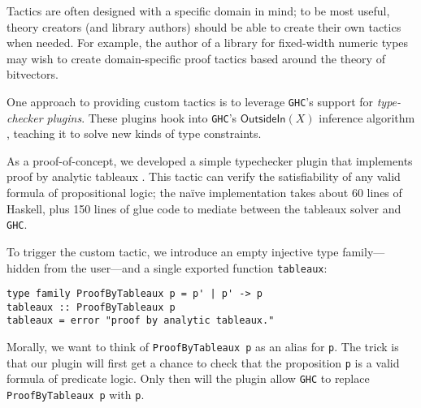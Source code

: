 \documentclass[format=sigplan, review=false, screen=true]{acmart}
\begin{document}
Tactics are often designed with a specific domain in mind; to be most useful,
theory creators (and library authors) should be able to create their own tactics
when needed. For example, the author of  a library for  fixed-width numeric types
may wish to create domain-specific proof tactics based around the theory of bitvectors.

One approach to providing custom tactics is to leverage \texttt{GHC}'s support for
\emph{type-checker plugins}. These plugins hook into \texttt{GHC}'s $\textsf{OutsideIn}(X)$
inference algorithm \cite{vytiniotis2011outsidein}, teaching it to solve
new kinds of type constraints.

As a proof-of-concept, we developed a simple typechecker plugin that implements
proof by analytic tableaux \cite{smullyan1995first}. This tactic can verify the satisfiability of any
valid formula of propositional logic; the na\"ive implementation takes about
60 lines of Haskell, plus 150 lines of glue code to mediate between
the tableaux solver and \texttt{GHC}.

To trigger the custom tactic, we introduce an empty injective type family---hidden
from the user---and a single exported function \texttt{tableaux}:
\begin{verbatim}
type family ProofByTableaux p = p' | p' -> p
tableaux :: ProofByTableaux p
tableaux = error "proof by analytic tableaux."
\end{verbatim}
Morally, we want to think of \texttt{ProofByTableaux p} as an alias for \texttt{p}.
The trick is that our plugin will first get a chance to check that the proposition \texttt{p} is
a valid formula of predicate logic. Only then will the plugin allow \texttt{GHC}
to replace \texttt{ProofByTableaux p} with \texttt{p}.
\end{document}
